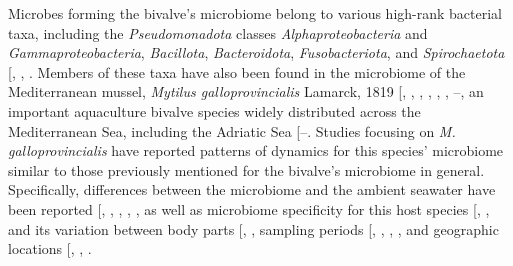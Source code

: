 \documentclass[
  12 pt,
]{article}
\begin{document}
Microbes forming the bivalve's microbiome belong to various high-rank bacterial taxa, including the \emph{Pseudomonadota} classes \emph{Alphaproteobacteria} and \emph{Gammaproteobacteria}, \emph{Bacillota}, \emph{Bacteroidota}, \emph{Fusobacteriota}, and \emph{Spirochaetota} {[}, , \citeproc{ref-Lasa2019}{25}{]}. Members of these taxa have also been found in the microbiome of the Mediterranean mussel, \emph{Mytilus galloprovincialis} Lamarck, 1819 {[}, , , , , , --\citeproc{ref-Zardinoni2024}{31}{]}, an important aquaculture bivalve species widely distributed across the Mediterranean Sea, including the Adriatic Sea {[}--\citeproc{ref-Wenne2022}{36}{]}. Studies focusing on \emph{M. galloprovincialis} have reported patterns of dynamics for this species' microbiome similar to those previously mentioned for the bivalve's microbiome in general. Specifically, differences between the microbiome and the ambient seawater have been reported {[}, , , , \citeproc{ref-Zardinoni2024}{31}{]}, as well as microbiome specificity for this host species {[}, , \citeproc{ref-Vezzulli2018}{16}{]} and its variation between body parts {[}, \citeproc{ref-Vezzulli2018}{16}{]}, sampling periods {[}, , , \citeproc{ref-Wathsala2021}{30}{]}, and geographic locations {[}, , \citeproc{ref-Palladino2023}{28}{]}.
\end{document}
